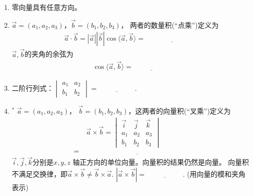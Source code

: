 \documentclass{article}
\newif\ifte
\renewcommand{\vec}{\overrightarrow}
\begin{document}
\begin{multicols}{2}
\begin{enumerate}[leftmargin=20pt]
\item 零向量具有任意方向。

\item $ \vec{a}=(a_1,a_2,a_3) $，$ \vec{b}=(b_1,b_2,b_3) $，
两者的数量积(“点乘”)定义为
\begin{gather*}
    \vec{a}\cdot\vec{b}=|\vec{a}||\vec{b}|
    \cos \langle\vec{a},\vec{b}\rangle=\underline{\ \ifte 
     a_1b_1+a_2b_2+a_3b_3\else \hspace{3cm} \fi\ }
\end{gather*}
$ \vec{a},\vec{b} $的夹角的余弦为
\begin{gather*}
    \cos \langle\vec{a},\vec{b}\rangle=\underline{\ 
    \ifte \dfrac{\vec{a}\cdot\vec{b}}{|\vec{a}||\vec{b}|}
    \else \hspace{2cm} \fi\ }
\end{gather*}

\renewcommand\arraystretch{1} 
\item 二阶行列式：$ \begin{vmatrix}
    a_1 & a_2\\
    b_1 & b_2
\end{vmatrix}=\underline{\ \ifte a_1b_2-a_2b_1
\else \hspace{2cm} \fi\ } $.

\item $^*$ $ \vec{a}=(a_1,a_2,a_3) $，
$ \vec{b}=(b_1,b_2,b_3) $，这两者的向量积(“叉乘”)定义为
\begin{align*}
    &\ \vec{a}\times\vec{b} =
    \begin{vmatrix}
        \vec{i} & \vec{j} & \vec{k} \\
        a_1 & a_2 & a_3 \\
        b_1 & b_2 & b_3
    \end{vmatrix} \\
    =&\ \underline{\ \ifte (a_2b_3-a_3b_2,
a_3b_1-a_1b_3, a_1b_2-a_2b_1)\else \hspace{6cm} \fi\ }
\end{align*}
$ \vec{i},\vec{j},\vec{k} $分别是$ x,y,z $
轴正方向的单位向量。向量积的结果仍然是向量。
向量积不满足交换律，即$ \vec{a}\times
\vec{b}\neq \vec{b}\times\vec{a} $.\qquad
$ |\vec{a}\times\vec{b}|=
\underline{\ \ifte |\vec{a}||\vec{b}|\sin\langle
 \vec{a},\vec{b}\rangle\else \hspace{2cm} \fi\ } $.
\ifte \else (用向量的模和夹角表示)\fi


\end{enumerate}
\end{multicols}
\end{document}
